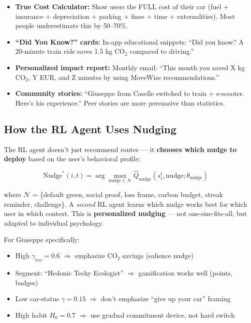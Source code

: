 \documentclass[11pt,a4paper]{article}
\begin{document}
\begin{itemize}[noitemsep]
    \item \textbf{True Cost Calculator:} Show users the FULL cost of their car (fuel + insurance + depreciation + parking + fines + time + externalities). Most people underestimate this by 50--70\%.
    \item \textbf{``Did You Know?'' cards:} In-app educational snippets: ``Did you know? A 20-minute train ride saves 1.5 kg CO$_2$ compared to driving.''
    \item \textbf{Personalized impact report:} Monthly email: ``This month you saved X kg CO$_2$, Y EUR, and Z minutes by using MoveWise recommendations.''
    \item \textbf{Community stories:} ``Giuseppe from Caselle switched to train + e-scooter. Here's his experience.'' Peer stories are more persuasive than statistics.
\end{itemize}

\subsection{How the RL Agent Uses Nudging}

The RL agent doesn't just recommend routes --- it \textbf{chooses which nudge to deploy} based on the user's behavioral profile:

\begin{equation}
\text{Nudge}^*(i, t) = \arg\max_{\text{nudge} \in \mathcal{N}} \hat{Q}_{\text{nudge}}(s_i^t, \text{nudge}; \theta_{\text{nudge}})
\end{equation}

where $\mathcal{N}$ = \{default green, social proof, loss frame, carbon budget, streak reminder, challenge\}. A \textit{second} RL agent learns which nudge works best for which user in which context. This is \textbf{personalized nudging} --- not one-size-fits-all, but adapted to individual psychology.

For Giuseppe specifically:
\begin{itemize}[noitemsep]
    \item High $\gamma_{\text{eco}} = 0.6$ $\Rightarrow$ emphasize CO$_2$ savings (salience nudge)
    \item Segment: ``Hedonic Techy Ecologist'' $\Rightarrow$ gamification works well (points, badges)
    \item Low car-status $\gamma = 0.15$ $\Rightarrow$ don't emphasize ``give up your car'' framing
    \item High habit $H_0 = 0.7$ $\Rightarrow$ use gradual commitment device, not hard switch
\end{itemize}
\end{document}
